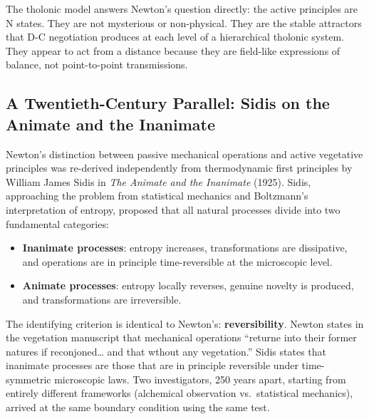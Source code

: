 \documentclass[12pt]{article}
\providecommand{\tightlist}{%
  \setlength{\itemsep}{0pt}\setlength{\parskip}{0pt}}
\begin{document}
The tholonic model answers Newton's question directly: the active
principles are N states. They are not mysterious or non-physical. They
are the stable attractors that D-C negotiation produces at each level of
a hierarchical tholonic system. They appear to act from a distance
because they are field-like expressions of balance, not point-to-point
transmissions.

\subsection{A Twentieth-Century Parallel: Sidis on the Animate and the Inanimate}\label{a-twentieth-century-parallel-sidis-on-the-animate-and-the-inanimate}

Newton's distinction between passive mechanical operations and active
vegetative principles was re-derived independently from thermodynamic
first principles by William James Sidis in \emph{The Animate and the
Inanimate} (1925). Sidis, approaching the problem from statistical
mechanics and Boltzmann's interpretation of entropy, proposed that all
natural processes divide into two fundamental categories:

\begin{itemize}
\tightlist
\item
  \textbf{Inanimate processes}: entropy increases, transformations are
  dissipative, and operations are in principle time-reversible at the
  microscopic level.
\item
  \textbf{Animate processes}: entropy locally reverses, genuine novelty
  is produced, and transformations are irreversible.
\end{itemize}

The identifying criterion is identical to Newton's:
\textbf{reversibility}. Newton states in the vegetation manuscript that
mechanical operations ``returne into their former natures if
reconjoned\ldots{} and that wthout any vegetation.'' Sidis states that
inanimate processes are those that are in principle reversible under
time-symmetric microscopic laws. Two investigators, 250 years apart,
starting from entirely different frameworks (alchemical observation
vs.~statistical mechanics), arrived at the same boundary condition using
the same test.
\end{document}
